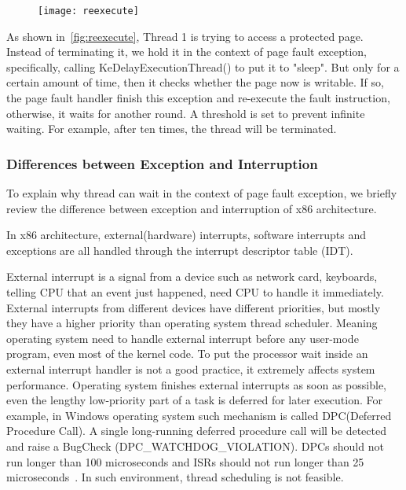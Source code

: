 \begin{figure}[th]
  \texttt{[image: reexecute]}
  \centering
  \caption{}
  \label{fig:reexecute}
\end{figure}

As shown in~\autoref{fig:reexecute}, Thread 1 is trying to access a protected page. Instead of terminating it, we hold it in the context of page fault exception, specifically, calling KeDelayExecutionThread() to put it to "sleep". But only for a certain amount of time, then it checks whether the page now is writable. If so, the page fault handler finish this exception and re-execute the fault instruction, otherwise, it waits for another round. A threshold is set to prevent infinite waiting. For example, after ten times, the thread will be terminated.

\subsubsection{Differences between Exception and Interruption}

To explain why thread can wait in the context of page fault exception, we briefly review the difference between exception and interruption of x86 architecture.

In x86 architecture, external(hardware) interrupts, software interrupts and exceptions are all handled through the interrupt descriptor table (IDT). 

External interrupt is a signal from a device such as network card, keyboards, telling CPU that an event just happened, need CPU to handle it immediately. External interrupts from different devices have different priorities, but mostly they have a higher priority than operating system thread scheduler. Meaning operating system need to handle external interrupt before any user-mode program, even most of the kernel code. To put the processor wait inside an external interrupt handler is not a good  practice, it extremely affects system performance. Operating system finishes external interrupts as soon as possible, even the lengthy low-priority part of a task is deferred for later execution. For example, in Windows operating system such mechanism is called DPC(Deferred Procedure Call). A single long-running deferred procedure call will be detected and raise a BugCheck (DPC_WATCHDOG_VIOLATION). DPCs should not run longer than 100 microseconds and ISRs should not run longer than 25 microseconds~\cite{msdnwatchdog}. In such environment, thread scheduling is not feasible.

